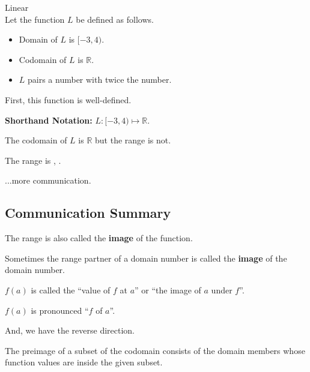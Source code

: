 \documentclass{ximera}
\begin{document}
\begin{example} Linear \\

Let the function $L$ be defined as follows.


\begin{itemize}
\item Domain of $L$ is $[-3, 4)$.
\item Codomain of $L$ is $\mathbb{R}$.
\item $L$ pairs a number with twice the number.
\end{itemize}


First, this function is well-defined. 


\textbf{Shorthand Notation: } $L: [-3, 4) \mapsto \mathbb{R}$.

\begin{question}

The codomain of $L$ is $\mathbb{R}$ but the range is not.  

The range is \wordChoice{\choice[correct]{[}\choice{(}}  ,  \wordChoice{\choice{]}\choice[correct]{)}}.

\end{question}



\end{example}
...more communication. \\






\subsection{Communication Summary}







The range is also called the \textbf{image} of the function.   

Sometimes the range partner of a domain number is called the \textbf{image} of the domain number.

$f(a)$ is called the ``value of $f$ at $a$'' or ``the image of $a$ under $f$''.


$f(a)$ is pronounced ``$f$ of $a$''.


And, we have the reverse direction.

The preimage of a subset of the codomain consists of the domain members whose function values are inside the given subset.
\end{document}

